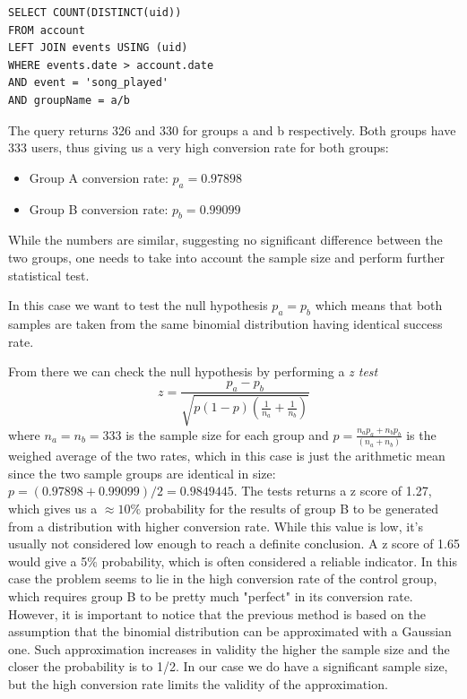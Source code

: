 \documentclass[paper=a4, fontsize=10pt]{report}
\begin{document}
\footnotesize
\begin{lstlisting}[frame=single,caption=Return conversion rates \label{code:sql_average_fixed_table}]
SELECT COUNT(DISTINCT(uid)) 
FROM account 
LEFT JOIN events USING (uid)
WHERE events.date > account.date
AND event = 'song_played'
AND groupName = a/b
\end{lstlisting}
\normalsize

The query returns 326 and 330 for groups a and b respectively. Both groups have 333 users, thus giving us a very high conversion rate for both groups:
\begin{itemize}
 \item Group A conversion rate: $p_{a} = 0.97898$
 \item Group B conversion rate: $p_{b} = 0.99099$
\end{itemize}


While the numbers are similar, suggesting no significant difference between the two groups, one needs to take into account the sample size and perform
further statistical test.


In this case we want to test the null hypothesis $p_{a} = p_{b}$ which means that both samples are taken from the same binomial distribution having identical
success rate.


From there we can check the null hypothesis by performing a \textit{z test}
\begin{equation}
 z = \frac{p_{a}-p_{b}}{\sqrt{p(1-p)(\frac{1}{n_{a}} + \frac{1}{n_{b}})}}
\end{equation}
where $n_{a} = n_{b} = 333 $ is the sample size for each group and $ p = \frac{n_{a}p_{a} + n_{b}p_{b}}{ (n_{a} + n_{b})}$ is the weighed average of the two rates,
which in this case is just the arithmetic mean since the two sample groups are identical in size: $p = (0.97898 + 0.99099)/2 = 0.9849445
$. The tests returns a z score of 1.27, which gives us a $\approx 10\%$ probability for the results of group B to be generated from a distribution with higher
conversion rate.
While this value is low, it's usually not considered low enough to reach a definite conclusion. A z score of 1.65 would give a 5$\%$ probability,
which is often considered a reliable indicator. In this case the problem seems to lie in the high conversion rate of the control group,
which requires group B to be pretty much "perfect" in its conversion rate.
However, it is important to notice that the previous method is based on the assumption that the binomial distribution can be approximated with a Gaussian one.
Such approximation increases in validity the higher the sample size and the closer the probability is to 1/2. In our case we do have a significant sample size, but the 
high conversion rate limits the validity of the approximation.
\end{document}
